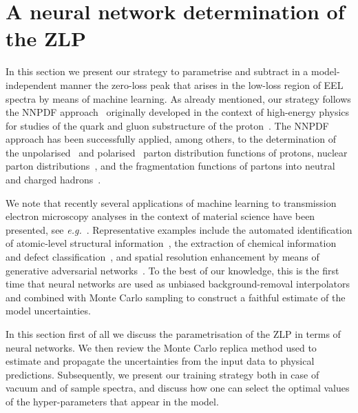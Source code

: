 \section{A neural network determination of the ZLP}
\label{sec:methodology}

In this section we present our strategy to parametrise and subtract in a model-independent manner
the zero-loss peak that arises in the low-loss region of EEL spectra by means
of machine learning.
%
As already mentioned, our strategy follows the 
NNPDF approach~\cite{Rojo:2018qdd} originally developed in the context of high-energy physics
for studies of the quark and gluon substructure of the proton~\cite{Gao:2017yyd}.
%
The NNPDF approach has been successfully applied, among others, to
the determination of the
unpolarised~\cite{DelDebbio:2007ee,Ball:2008by,Ball:2012cx,Ball:2014uwa,Ball:2017nwa}
and polarised~\cite{Nocera:2014gqa} parton distribution functions of protons,  nuclear
parton distributions~\cite{AbdulKhalek:2019mzd,AbdulKhalek:2020yuc}, and the
fragmentation functions of partons into neutral and charged
hadrons~\cite{Bertone:2017tyb,Bertone:2018ecm}.

We note that recently several applications of machine learning
to transmission electron microscopy analyses 
in the context of material science have been
presented, see {\it e.g.}~\cite{Gordon:2020, Zhang:2019, Jany:2017, Ziatdinov:2017,10.1145/2834892.2834896,doi:10.1021/acsnano.7b07504,cite-key}.
%
Representative examples
include the automated identification
of atomic-level structural information~\cite{10.1145/2834892.2834896},
the extraction of chemical information
and defect classification~\cite{doi:10.1021/acsnano.7b07504},
and spatial resolution enhancement
by means of generative adversarial networks~\cite{cite-key}.
%
To the best of our knowledge, this is
the first time that neural networks are used as 
 unbiased
 background-removal interpolators
 and combined with Monte Carlo sampling to construct a faithful estimate
of the model uncertainties.

In this section
first of all we discuss the parametrisation of the ZLP in terms of neural networks.
%
We then review the Monte Carlo replica method used to estimate and propagate the
uncertainties from the input data to physical predictions.
%
Subsequently, we present our training strategy both in case of vacuum and of sample spectra,
and discuss how one can select the optimal values of the hyper-parameters that appear in the model.

